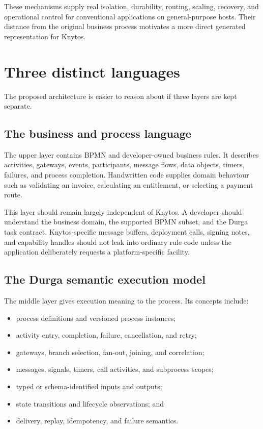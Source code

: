 These mechanisms supply real isolation, durability, routing, scaling, recovery,
and operational control for conventional applications on general-purpose
hosts. Their distance from the original business process motivates a more
direct generated representation for Knytos.

\section{Three distinct languages}

The proposed architecture is easier to reason about if three layers are kept
separate.

\subsection{The business and process language}

The upper layer contains BPMN and developer-owned business rules. It describes
activities, gateways, events, participants, message flows, data objects, timers,
failures, and process completion. Handwritten code supplies domain behaviour
such as validating an invoice, calculating an entitlement, or selecting a
payment route.

This layer should remain largely independent of Knytos. A developer should
understand the business domain, the supported BPMN subset, and the Durga task
contract. Knytos-specific message buffers, deployment calls, signing notes,
and capability handles should not leak into ordinary rule code unless the
application deliberately requests a platform-specific facility.

\subsection{The Durga semantic execution model}

The middle layer gives execution meaning to the process. Its concepts include:

\begin{itemize}
    \item process definitions and versioned process instances;
    \item activity entry, completion, failure, cancellation, and retry;
    \item gateways, branch selection, fan-out, joining, and correlation;
    \item messages, signals, timers, call activities, and subprocess scopes;
    \item typed or schema-identified inputs and outputs;
    \item state transitions and lifecycle observations; and
    \item delivery, replay, idempotency, and failure semantics.
\end{itemize}


